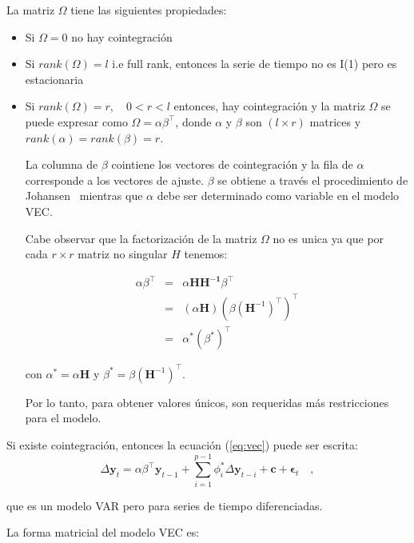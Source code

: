     La matriz $\Omega$ tiene las siguientes propiedades:
    \begin{itemize}
    \item Si $\Omega = 0$ no hay cointegración 
    \item Si $rank(\Omega)=l$ i.e full rank, entonces la serie de tiempo no es I(1) pero es estacionaria
    \item Si $rank(\Omega)=r,\quad 0 < r < l$ entonces, hay cointegración 
    y la matriz $\Omega$ se puede expresar como $\Omega =
    \alpha \beta^\intercal$, donde $\alpha$ y $\beta$ son $(l \times r)$
    matrices y $rank(\alpha)=rank(\beta)=r$.

    La columna de $\beta$ cointiene los vectores de cointegración y la fila de
    $\alpha$ corresponde a los vectores de ajuste. $\beta$ se obtiene a través
    el procedimiento de Johansen~\cite{johansen1988} mientras que $\alpha$ debe
    ser determinado como variable en el modelo VEC.

    Cabe observar que la factorización de la matriz $\Omega$ no es unica ya que por cada
    $r \times r$ matriz no singular $H$ tenemos:

\begin{eqnarray*}
\alpha \beta^\intercal &=& \alpha \mathbf{HH^{-1}} \beta^\intercal\\
&=&(\alpha\mathbf{H})(\beta(\mathbf{H}^{-1})^\intercal)^\intercal \\
&=& \alpha^*(\beta^*)^\intercal
\end{eqnarray*}

\noindent con $\alpha^* = \alpha\mathbf{H}$ y $\beta^* =
\beta(\mathbf{H}^{-1})^\intercal$.

Por lo tanto, para obtener valores únicos, son requeridas más restricciones
para el modelo.

\end{itemize}

Si existe cointegración, entonces la ecuación (\ref{eq:vec}) puede ser escrita:
\begin{equation}
 \label{eq:vecfull}
  \Delta \mathbf{y}_t = \alpha \beta^\intercal\mathbf{y}_{t-1} 
   + \sum_{i=1}^{p-1} \phi_i^*\Delta
   \mathbf{y}_{t-i}  + \mathbf{c} + \mathbf{\epsilon}_t \quad ,
   \end{equation}

   \noindent que es un modelo VAR pero para series de tiempo diferenciadas.

La forma matricial del modelo VEC es:

